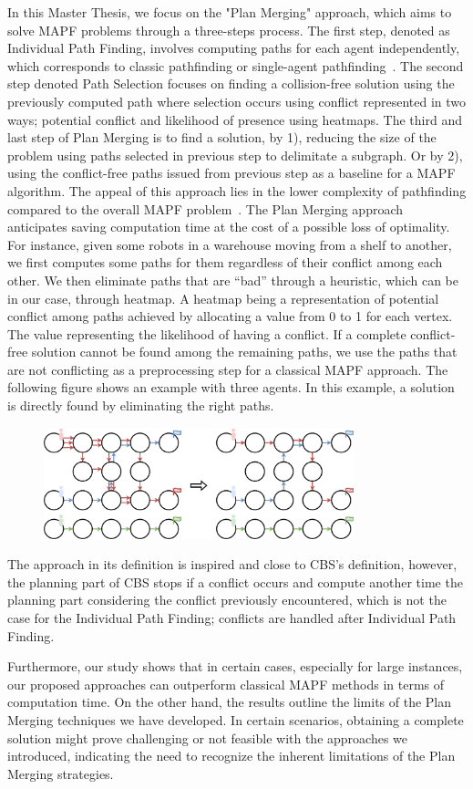 In this Master Thesis, we focus on the "Plan Merging" approach, which aims to solve MAPF problems through a three-steps process. The first step, denoted as Individual Path Finding, involves computing paths for each agent independently, which corresponds to classic pathfinding or single-agent pathfinding~\cite{foghkuhagu21a}. The second step denoted Path Selection focuses on finding a collision-free solution using the previously computed path where selection occurs using conflict represented in two ways; potential conflict and likelihood of presence using heatmaps. The third and last step of Plan Merging is to find a solution, by 1), reducing the size of the problem using paths selected in previous step to delimitate a subgraph. Or by 2), using the conflict-free paths issued from previous step as a baseline for a MAPF algorithm. The appeal of this approach lies in the lower complexity of pathfinding compared to the overall MAPF problem~\cite{nebel19a}. The Plan Merging approach anticipates saving computation time at the cost of a possible loss of optimality. For instance, given some robots in a warehouse moving from a shelf to another, we first computes some paths for them regardless of their conflict among each other. We then eliminate paths that are ``bad'' through a heuristic, which can be in our case, through heatmap. A heatmap being a representation of potential conflict among paths achieved by allocating a value from 0 to 1 for each vertex. The value representing the likelihood of having a conflict. If a complete conflict-free solution cannot be found among the remaining paths, we use the paths that are not conflicting as a preprocessing step for a classical MAPF approach. The following figure shows an example with three agents. In this example, a solution is directly found by eliminating the right paths. 

\begin{figure}[H]
    \centering
    \includegraphics[width=9cm]{img/pm_example_intro.png}
\end{figure}

The approach in its definition is inspired and close to CBS's definition, however, the planning part of CBS stops if a conflict occurs and compute another time the planning part considering the conflict previously encountered, which is not the case for the Individual Path Finding; conflicts are handled after Individual Path Finding. 

Furthermore, our study shows that in certain cases, especially for large instances, our proposed approaches can outperform classical MAPF methods in terms of computation time. On the other hand, the results  outline the limits of the Plan Merging techniques we have developed. In certain scenarios, obtaining a complete solution might prove challenging or not feasible with the approaches we introduced, indicating the need to recognize the inherent limitations of the Plan Merging strategies.